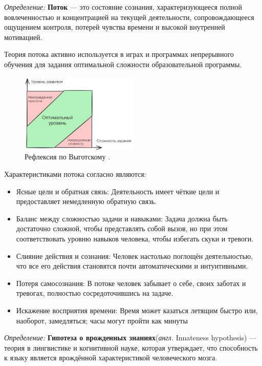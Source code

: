 \textit{Определение:} \textbf{Поток} --- это состояние сознания, характеризующееся полной вовлеченностью и концентрацией
на текущей деятельности, сопровождающееся ощущением контроля, потерей чувства времени и высокой внутренней мотивацией.

Теория потока активно используется в играх \cite{chen2007flow} и программах непрерывного обучения \cite{jarvis2009routledge} для
задания оптимальной сложности образовательной программы.

\begin{figure}[h]
    \centering
    \includegraphics[width=0.5\textwidth]{assets/pedagogic/psy/flow.excalidraw.png}
    \caption{Рефлексия по Выготскому \cite{выготский2014мышление}.}
    \label{reflection}
\end{figure}

Характеристиками потока согласно \cite{csikszentmihalyi2005flow} являются:
 \begin{itemize}
    \item Ясные цели и обратная связь: Деятельность имеет чёткие цели и предоставляет немедленную обратную связь.
    \item Баланс между сложностью задачи и навыками: Задача должна быть достаточно сложной, чтобы представлять собой вызов, но при этом соответствовать уровню навыков человека, чтобы избегать скуки и тревоги.
    \item Слияние действия и сознания: Человек настолько поглощён деятельностью, что все его действия становятся почти автоматическими и интуитивными.
    \item Потеря самосознания: В потоке человек забывает о себе, своих заботах и тревогах, полностью сосредоточившись на задаче.
    \item Искажение восприятия времени: Время может казаться летящим быстро или, наоборот, замедляться; часы могут пройти как минуты
\end{itemize}


\textit{Определение:} \textbf{Гипотеза о врожденных знаниях}(\textit{англ.} Innateness hypothesis) --- теория в лингвистике и когнитивной науке,
 которая утверждает, что способность к языку является врождённой характеристикой человеческого мозга. 

